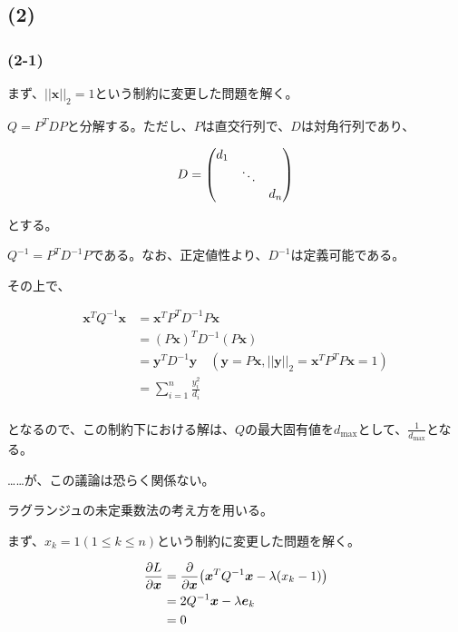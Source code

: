 \documentclass[a4paper, 10pt, dvipdfmx]{jlreq}
\begin{document}
\subsection*{(2)}

\subsubsection*{(2-1)}

{\color{lightgray}

まず、$||\bm{x}||_2=1$という制約に変更した問題を解く。

$Q=P^TDP$と分解する。ただし、$P$は直交行列で、$D$は対角行列であり、

\begin{align*}
  D=\mqty(d_1 &  & \\ & \ddots & \\ & & d_n)
\end{align*}

とする。

$Q^{-1}=P^TD^{-1}P$である。なお、正定値性より、$D^{-1}$は定義可能である。

その上で、

\begin{align*}
  \bm{x}^TQ^{-1}\bm{x} & = \bm{x}^TP^TD^{-1}P\bm{x}                                                      \\
                       & = (P\bm{x})^TD^{-1}(P\bm{x})                                                    \\
                       & = \bm{y}^TD^{-1}\bm{y} \quad (\bm{y}=P\bm{x},||\bm{y}||_2=\bm{x}^TP^TP\bm{x}=1) \\
                       & = \sum_{i=1}^{n}\frac{y_i^2}{d_i}                                               \\
\end{align*}

となるので、この制約下における解は、$Q$の最大固有値を$d_{\text{max}}$として、$\frac{1}{d_{\text{max}}}$となる。

}

……が、この議論は恐らく関係ない。

ラグランジュの未定乗数法の考え方を用いる。

まず、$x_k=1(1\leq k \leq n)$という制約に変更した問題を解く。

\begin{align*}
  \pdv{L}{\bm{x}} & =\pdv{\bm{x}} \qty(\bm{x}^TQ^{-1}\bm{x}-\lambda(x_k-1)) \\
                  & = 2Q^{-1}\bm{x}-\lambda \bm{e}_k                        \\
                  & = 0
\end{align*}
\end{document}
